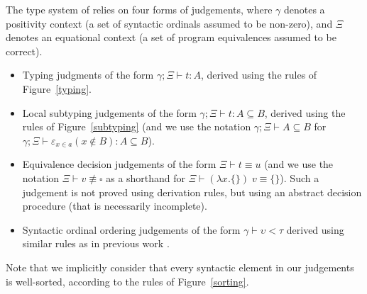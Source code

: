 \begin{definition}[judgements]
  The type system of \pml relies on four forms of judgements, where $\gamma$
  denotes a positivity context (a set of syntactic ordinals assumed to be
  non-zero), and $\Xi$ denotes an equational context (a set of program
  equivalences assumed to be correct).
  \begin{itemize}
    \item Typing judgments of the form $\gamma; \Xi \vdash t : A$, derived
          using the rules of Figure~\ref{typing}.
    \item Local subtyping judgements of the form $\gamma; \Xi \vdash t : A
          \subseteq B$, derived using the rules of Figure~\ref{subtyping}
          (and we use the notation $\gamma; \Xi \vdash A \subseteq B$ for
          $\gamma;\Xi\vdash\varepsilon_{x \in a}(x \notin B):A \subseteq B$).
    \item Equivalence decision judgements of the form $\Xi \vdash t \equiv u$
          (and we use the notation $\Xi \vdash v \not\equiv \square$ as a
          shorthand for $\Xi \vdash (\lambda x.\{\})\;v \equiv \{\}$). Such
          a judgement is not proved using derivation rules, but using an
          abstract decision procedure (that is necessarily incomplete).
    \item Syntactic ordinal ordering judgements of the form $\gamma \vdash
          \upsilon < \tau$ derived using similar rules as in previous work
          \cite{subml}.
  \end{itemize}
  Note that we implicitly consider that every syntactic element in our
  judgements is well-sorted, according to the rules of Figure~\ref{sorting}.
\end{definition}


